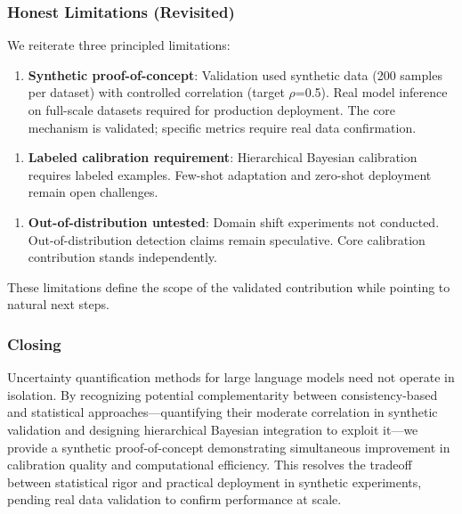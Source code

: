 \subsubsection{Honest Limitations (Revisited)}

We reiterate three principled limitations:

\begin{enumerate}
\item \textbf{Synthetic proof-of-concept}: Validation used synthetic data (200 samples per dataset) with controlled correlation (target $\rho$=0.5). Real model inference on full-scale datasets required for production deployment. The core mechanism is validated; specific metrics require real data confirmation.
\end{enumerate}

\begin{enumerate}
\item \textbf{Labeled calibration requirement}: Hierarchical Bayesian calibration requires labeled examples. Few-shot adaptation and zero-shot deployment remain open challenges.
\end{enumerate}

\begin{enumerate}
\item \textbf{Out-of-distribution untested}: Domain shift experiments not conducted. Out-of-distribution detection claims remain speculative. Core calibration contribution stands independently.
\end{enumerate}

These limitations define the scope of the validated contribution while pointing to natural next steps.

\subsubsection{Closing}

Uncertainty quantification methods for large language models need not operate in isolation. By recognizing potential complementarity between consistency-based and statistical approaches---quantifying their moderate correlation in synthetic validation and designing hierarchical Bayesian integration to exploit it---we provide a synthetic proof-of-concept demonstrating simultaneous improvement in calibration quality and computational efficiency. This resolves the tradeoff between statistical rigor and practical deployment in synthetic experiments, pending real data validation to confirm performance at scale.
